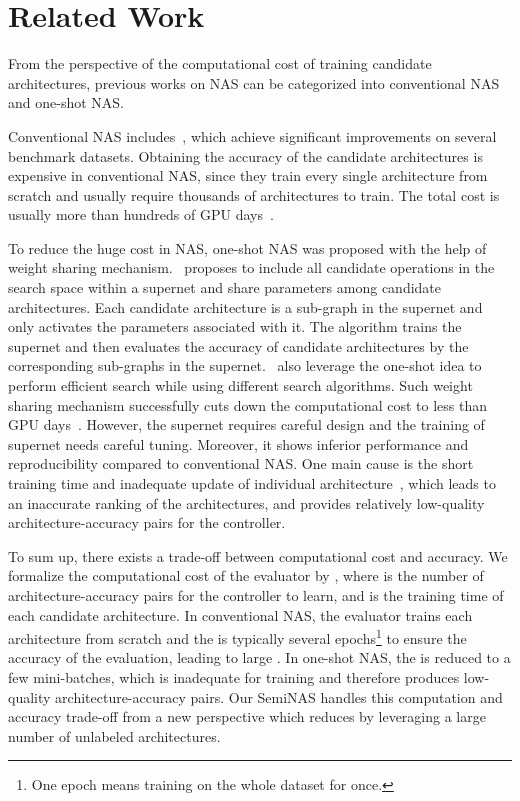 \documentclass{article}
\begin{document}
\section{Related Work}
From the perspective of the computational cost of training candidate architectures, previous works on NAS can be categorized into conventional NAS and one-shot NAS. 

Conventional NAS includes~\cite{nas,nasnet,amoebanet,nao}, which achieve significant improvements on several benchmark datasets. Obtaining the accuracy of the candidate architectures is expensive in conventional NAS, since they train every single architecture from scratch and usually require thousands of architectures to train. The total cost is usually more than hundreds of GPU days~\cite{nasnet,amoebanet,nao}.

To reduce the huge cost in NAS, one-shot NAS was proposed with the help of weight sharing mechanism.~\cite{oneshot} proposes to include all candidate operations in the search space within a supernet and share parameters among candidate architectures. Each candidate architecture is a sub-graph in the supernet and only activates the parameters associated with it. The algorithm trains the supernet and then evaluates the accuracy of candidate architectures by the corresponding sub-graphs in the supernet.~\cite{enas,nao,darts,pdarts,pcdarts,proxylessnas,singlepathnas,singlepathoneshot} also leverage the one-shot idea to perform efficient search while using different search algorithms. Such weight sharing mechanism successfully cuts down the computational cost to less than  GPU days~\cite{enas,darts,proxylessnas,pcdarts}. However, the supernet requires careful design and the training of supernet needs careful tuning. Moreover, it shows inferior performance and reproducibility compared to conventional NAS. One main cause is the short training time and inadequate update of individual architecture~\cite{random,searchphasenas}, which leads to an inaccurate ranking of the architectures, and provides relatively low-quality architecture-accuracy pairs for the controller.

To sum up, there exists a trade-off between computational cost and accuracy. We formalize the computational cost of the evaluator by , where  is the number of architecture-accuracy pairs for the controller to learn, and  is the training time of each candidate architecture. In conventional NAS, the evaluator trains each architecture from scratch and the  is typically several epochs\footnote{One epoch means training on the whole dataset for once.} to ensure the accuracy of the evaluation, leading to large . In one-shot NAS, the  is reduced to a few mini-batches, which is inadequate for training and therefore produces low-quality architecture-accuracy pairs. Our SemiNAS handles this computation and accuracy trade-off from a new perspective which reduces  by leveraging a large number of unlabeled architectures.
\end{document}
